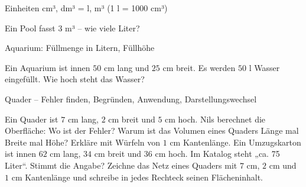 \begin{aufgabe}{Einheiten cm³, dm³ = l, m³ (1 l = 1000 cm³)}
\begin{teile}
\teil Ein Pool fasst $3$ m³ – wie viele Liter? \leerfeld[l]
\end{teile}
\end{aufgabe}

\begin{aufgabe}{Aquarium: Füllmenge in Litern, Füllhöhe}
\begin{teile}
\teil Ein Aquarium ist innen $50$ cm lang und $25$ cm breit. Es werden $50$ l Wasser eingefüllt. Wie hoch steht das Wasser? \leerfeld[cm]
\end{teile}
\end{aufgabe}

\begin{aufgabe}{Quader – Fehler finden, Begründen, Anwendung, Darstellungswechsel}
\begin{teile}
\teil Ein Quader ist $7$ cm lang, $2$ cm breit und $5$ cm hoch. Nils berechnet die Oberfläche:  Wo ist der Fehler?
\teil Warum ist das Volumen eines Quaders Länge mal Breite mal Höhe? Erkläre mit Würfeln von $1$ cm Kantenlänge.
\teil Ein Umzugskarton ist innen $62$ cm lang, $34$ cm breit und $36$ cm hoch. Im Katalog steht „ca. 75 Liter“. Stimmt die Angabe?
\teil Zeichne das Netz eines Quaders mit $7$ cm, $2$ cm und $1$ cm Kantenlänge und schreibe in jedes Rechteck seinen Flächeninhalt.

\end{teile}
\end{aufgabe}

